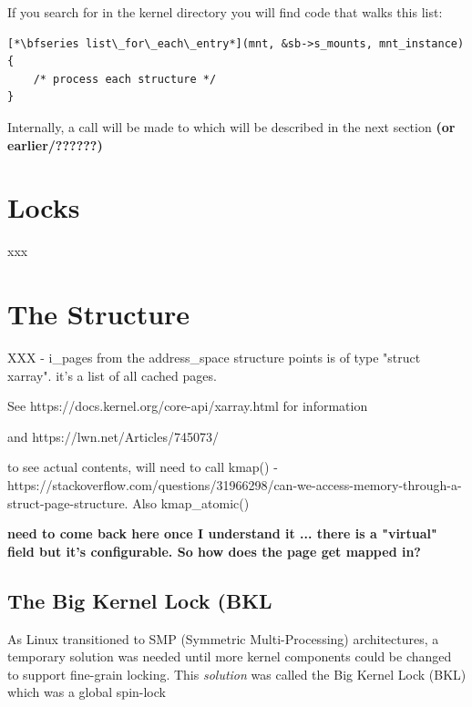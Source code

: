 \noindent
If you search for  in the kernel  directory you will find code that walks this list:

\begin{lstlisting}
[*\bfseries list\_for\_each\_entry*](mnt, &sb->s_mounts, mnt_instance) {
    /* process each structure */
}
\end{lstlisting}

\noindent
Internally, a call will be made to  which will be described in the next section \textbf{(or earlier/??????)}


\section{Locks}

xxx


\section{The  Structure}

XXX - i\_pages from the address\_space structure points is of type "struct xarray". it's a list of all cached pages.

See https://docs.kernel.org/core-api/xarray.html for information

and https://lwn.net/Articles/745073/

to see actual contents, will need to call kmap() -  https://stackoverflow.com/questions/31966298/can-we-access-memory-through-a-struct-page-structure. Also kmap\_atomic()

\textbf{need to come back here once I understand it ... there is a "virtual" field but it's configurable. So how does the page get mapped in?}


\subsection{The Big Kernel Lock (BKL}

As Linux transitioned to SMP (Symmetric Multi-Processing) architectures, a temporary solution was needed until more kernel components could be changed to support fine-grain locking. This \textit{solution} was called the Big Kernel Lock (BKL) which was a global spin-lock 

